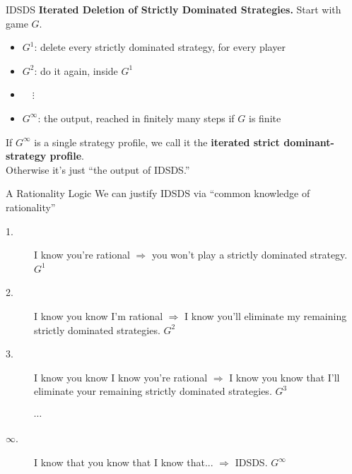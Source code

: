 \begin{frame}{IDSDS}
\textbf{Iterated Deletion of Strictly Dominated Strategies.}
\bsk
Start with game $G$.
\begin{itemize}
    \item $G^1$: delete every strictly dominated strategy, for every player
    \item $G^2$: do it again, inside $G^1$
    \item \ \ $\vdots$
    \item $G^\infty$: the output, reached in finitely many steps if $G$ is finite
\end{itemize}
\bsk
If $G^\infty$ is a single strategy profile, we call it the
\textbf{iterated strict dominant-strategy profile}.\\
Otherwise it's just ``the output of IDSDS.''
\end{frame}

\begin{frame}{A Rationality Logic}
We can justify IDSDS via ``common knowledge of rationality''
\begin{description}
    \item[1.] I know you're rational $\Rightarrow$ you won't play a strictly dominated strategy. $G^1$
    \item[2.] I know you know I'm rational $\Rightarrow$ I know you'll eliminate my remaining strictly dominated strategies. $G^2$
    \item[3.] I know you know I know you're rational $\Rightarrow$ I know you know that I'll eliminate your remaining strictly dominated strategies. $G^3$
    \item[] $\cdots$
    \item[$\infty$.] I know that you know that I know that... $\Rightarrow$ IDSDS. $G^\infty$
\end{description}
    
\end{frame}


